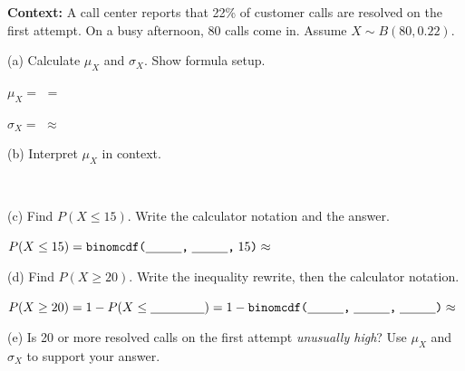 \documentclass[10pt]{article}
\begin{document}
\begin{tcolorbox}[colback=sky, colframe=navy, boxrule=1pt, arc=2mm,
    title={\bfseries Tier A \quad Approaching Proficiency: A Full Binomial Analysis},
    fonttitle=\small]
\small

\textbf{Context:} A call center reports that 22\% of customer calls are resolved
on the first attempt. On a busy afternoon, 80 calls come in. Assume $X \sim B(80, 0.22)$.

\vspace{8pt}
(a) Calculate $\mu_X$ and $\sigma_X$. Show formula setup.

\vspace{4pt}
$\mu_X = $ \blank{6cm} $= $ \blank{2cm}

$\sigma_X = $ \blank{6cm} $\approx$ \blank{2cm}

\vspace{8pt}
(b) Interpret $\mu_X$ in context.

\vspace{4pt}
\writeline\\[1pt]\writeline

\vspace{8pt}
(c) Find $P(X \le 15)$. Write the calculator notation and the answer.

\vspace{4pt}
$P(X \le 15) = \texttt{binomcdf(}\blank{1cm}\texttt{,}\;\blank{1cm}\texttt{,}\;15\texttt{)} \approx $ \blank{2cm}

\vspace{8pt}
(d) Find $P(X \ge 20)$. Write the inequality rewrite, then the calculator notation.

\vspace{4pt}
$P(X \ge 20) = 1 - P(X \le \blank{1.5cm}) = 1 - \texttt{binomcdf(}\blank{1cm}\texttt{,}\;\blank{1cm}\texttt{,}\;\blank{1cm}\texttt{)} \approx $ \blank{2cm}

\vspace{8pt}
(e) Is 20 or more resolved calls on the first attempt \emph{unusually high}?
Use $\mu_X$ and $\sigma_X$ to support your answer.

\vspace{4pt}
\writeline\\[1pt]\writeline
\vspace{4pt}
\end{tcolorbox}

\vspace{0.1in}
\end{document}
